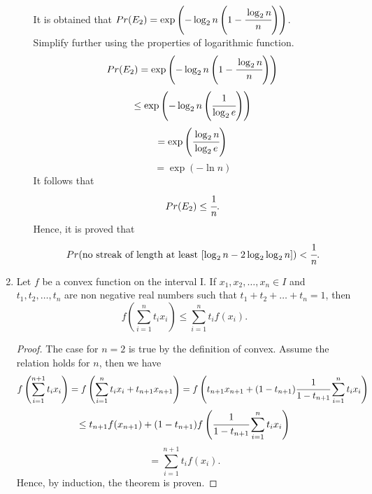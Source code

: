 \documentclass{article}
\begin{document}
\begin{enumerate}
\begin{enumerate}
            It is obtained that \( Pr(E_2) = \exp\left(-\log_2 n \left(1 - \cfrac{\log_2 n}{n}\right)\right) \).\\
            Simplify further using the properties of logarithmic function.
            \[
                Pr(E_2) = \exp\left(-\log_2 n \left(1 - \cfrac{\log_2 n}{n}\right)\right)
            \]
            \[
                \leq \exp\left(-\log_2 n \left(\cfrac{1}{\log_2 e}\right)\right)
            \]
            \[
                = \exp\left(\cfrac{\log_2 n}{\log_2 e}\right)
            \]
            \[
                = \exp(-\ln n)
            \]
            It follows that
            \[
                Pr(E_2) \leq \cfrac{1}{n}.
            \]
            Hence, it is proved that
            \[
                Pr(\text{no streak of length at least } [\log_2 n - 2\log_2 \log_2 n]) < \cfrac{1}{n}.
            \]
    \end{enumerate}

\newpage
\item 
    Let \(f\) be a convex function on the interval I. If \(x_1, x_2, \ldots, x_n \in I\) and \(t_1, t_2, \ldots, t_n\) are non negative real numbers such that \(t_1 + t_2 + \ldots + t_n = 1\), then
    \[
        f\left(\sum_{i=1}^{n} t_ix_i\right) \leq \sum_{i=1}^{n} t_if(x_i).
    \]
    \begin{proof}
    The case for \(n = 2\) is true by the definition of convex. Assume the relation holds for \(n\), then we have
    \[ 
        f\left(\sum_{i=1}^{n+1} t_ix_i\right) = f\left(\sum_{i=1}^{n} t_ix_i + t_{n+1}x_{n+1}\right) = f\left(t_{n+1}x_{n+1} + (1 - t_{n+1}) \cfrac{1}{1 - t_{n+1}}\sum_{i=1}^{n} t_ix_i\right) 
    \]
    \[ 
        \leq t_{n+1}f(x_{n+1}) + (1 - t_{n+1})f\left(\cfrac{1}{1 - t_{n+1}}\sum_{i=1}^{n} t_ix_i\right) 
    \]
    \[ 
        = \sum_{i=1}^{n+1} t_if(x_i).
    \]
    Hence, by induction, the theorem is proven.
    \end{proof}
\end{enumerate}
\end{document}
